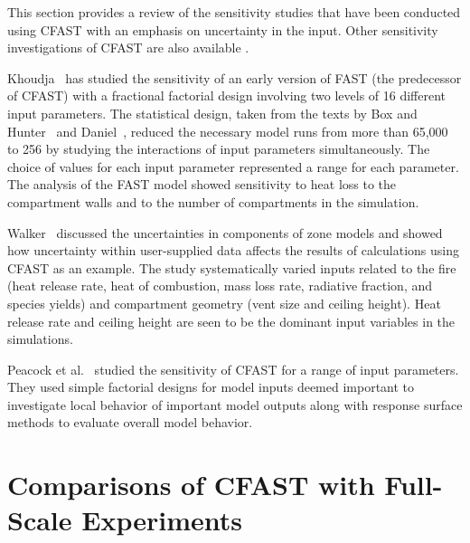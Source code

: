 This section provides a review of the sensitivity studies that have been conducted using CFAST with an emphasis on uncertainty in the input. Other sensitivity investigations of CFAST are also available \cite{Peacock:1988a, Beard:1992, Notarianni:2000}.

Khoudja~\cite{Khoudja:1988} has studied the sensitivity of an early version of FAST (the predecessor of CFAST) with a fractional factorial design involving two levels of 16 different input parameters. The statistical design, taken from the texts by Box and Hunter~\cite{Box:1978} and Daniel~\cite{Daniel:1976}, reduced the necessary model runs from more than 65,000 to 256 by studying the interactions of input parameters simultaneously. The choice of values for each input parameter represented a range for each parameter. The analysis of the FAST model showed sensitivity to heat loss to the compartment walls and to the number of compartments in the simulation.

Walker~\cite{Walker:1997} discussed the uncertainties in components of zone models and showed how uncertainty within user-supplied data affects the results of calculations using CFAST as an example. The study systematically varied inputs related to the fire (heat release rate, heat of combustion, mass loss rate, radiative fraction, and species yields) and compartment geometry (vent size and ceiling height). Heat release rate and ceiling height are seen to be the dominant input variables in the simulations.

Peacock et al.~\cite{Peacock:1988a} studied the sensitivity of CFAST for a range of input parameters. They used simple factorial designs for model inputs deemed important to investigate local behavior of important model outputs along with response surface methods to evaluate overall model behavior.


\section{Comparisons of CFAST with Full-Scale Experiments}

